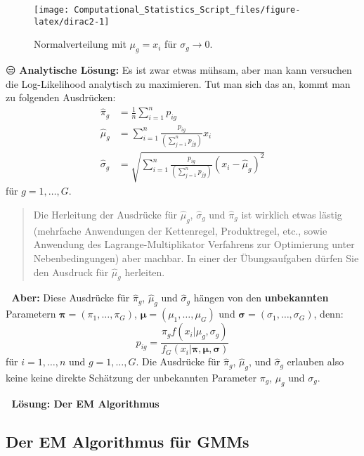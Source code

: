 \documentclass[
  ngerman,
]{book}
\begin{document}
\begin{figure}[h]

{\centering \texttt{[image: Computational\_Statistics\_Script\_files/figure-latex/dirac2-1]} 

}

\caption{Normalverteilung mit $\mu_g=x_i$ für $\sigma_g\to 0$.}\label{fig:dirac2}
\end{figure}

😒 \textbf{Analytische Lösung:} Es ist zwar etwas mühsam, aber man kann versuchen die Log-Likelihood analytisch zu maximieren. Tut man sich das an, kommt man zu folgenden Ausdrücken:
\begin{align*}
\hat\pi_g&=\frac{1}{n}\sum_{i=1}^np_{ig}\\
\hat\mu_g&=\sum_{i=1}^n\frac{p_{ig}}{\left(\sum_{j=1}^np_{jg}\right)}x_i\\
\hat\sigma_g&=\sqrt{\sum_{i=1}^n\frac{p_{ig}}{\left(\sum_{j=1}^np_{jg}\right)}\left(x_i-\hat\mu_g\right)^2}
\end{align*}
für \(g=1,\dots,G\).

\begin{quote}
Die Herleitung der Ausdrücke für \(\hat{\mu}_g\), \(\hat{\sigma}_g\) und \(\hat{\pi}_g\) ist wirklich etwas lästig (mehrfache Anwendungen der Kettenregel, Produktregel, etc., sowie Anwendung des Lagrange-Multiplikator Verfahrens zur Optimierung unter Nebenbedingungen) aber machbar. In einer der Übungsaufgaben dürfen Sie den Ausdruck für \(\hat\mu_g\) herleiten.
\end{quote}

🙈 {\textbf{Aber:}} Diese Ausdrücke für \(\hat\pi_g\), \(\hat\mu_g\) und \(\hat\sigma_g\) hängen von den {\textbf{unbekannten}} Parametern \(\boldsymbol{\pi}=(\pi_1,\dots,\pi_G)\), \(\boldsymbol{\mu}=(\mu_1,\dots,\mu_G)\) und \(\boldsymbol{\sigma}=(\sigma_1,\dots,\sigma_G)\), denn:
\[
p_{ig}=\frac{\pi_gf(x_i|\mu_g,\sigma_g)}{f_G(x_i|\boldsymbol{\pi},\boldsymbol{\mu},\boldsymbol{\sigma})}
\]
für \(i=1,\dots,n\) und \(g=1,\dots,G\). Die Ausdrücke für \(\hat\pi_g\), \(\hat\mu_g\), und \(\hat\sigma_g\) erlauben also keine keine direkte Schätzung der unbekannten Parameter \(\pi_g\), \(\mu_g\) und \(\sigma_g\).

🥳 {\textbf{Lösung: Der EM Algorithmus}}

\hypertarget{ch:EM1}{%
\subsection{Der EM Algorithmus für GMMs}\label{ch:EM1}}
\end{document}
